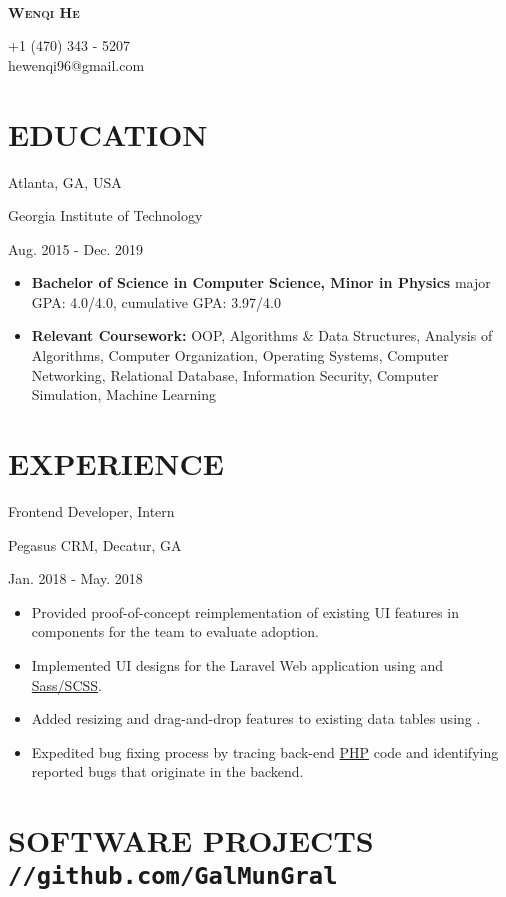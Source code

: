 \documentclass[11pt]{article}
\newcommand{\centertitle}[3]{
	{\noindent\bfseries
	\parbox[][0.5em][b]{0.35\textwidth}{#1\hfill}%
	\parbox[][0.5em][b]{0.3\textwidth}{\centerline{#2}}%
	\parbox[][0.5em][b]{0.35\textwidth}{\hfill#3}}
}
\begin{document}
\noindent
\parbox{0.2\textwidth}{\,}
\parbox{0.6\textwidth}{\centerline{\huge\scshape\bfseries Wenqi He}}
\parbox{0.2\textwidth}{+1 (470) 343 - 5207 \\hewenqi96@gmail.com}

\section*{EDUCATION}
\centertitle{Atlanta, GA, USA}{Georgia Institute of Technology}{Aug. 2015 - Dec. 2019}
\begin{itemize}[leftmargin=15pt, noitemsep, topsep=0pt]
\item \textbf{Bachelor of Science in Computer Science, Minor in Physics} \hfill major GPA: 4.0/4.0, cumulative GPA: 3.97/4.0
\item \textbf{Relevant Coursework:} OOP, Algorithms \& Data Structures, Analysis of Algorithms, Computer Organization, Operating Systems, Computer Networking, Relational Database, Information Security, Computer Simulation, Machine Learning
\end{itemize}
\vspace{-0.5em}

\section*{EXPERIENCE}
\centertitle{Frontend Developer, Intern}{Pegasus CRM, Decatur, GA}{Jan. 2018 - May. 2018}
\begin{itemize}[leftmargin=15pt, noitemsep, topsep=0pt]
\item Provided proof-of-concept reimplementation of existing UI features in \underline{} components for the team to evaluate adoption.
\item Implemented UI designs for the Laravel Web application using \underline{} and \underline{Sass/SCSS}. 
\item Added resizing and drag-and-drop features to existing data tables using \underline{}.
\item Expedited bug fixing process by tracing back-end \underline{PHP} code and identifying reported bugs that originate in the backend.
\end{itemize}
\vspace{-0.5em}

\section*{SOFTWARE PROJECTS \hfill \normalsize\texttt{//github.com/GalMunGral}}
\end{document}
